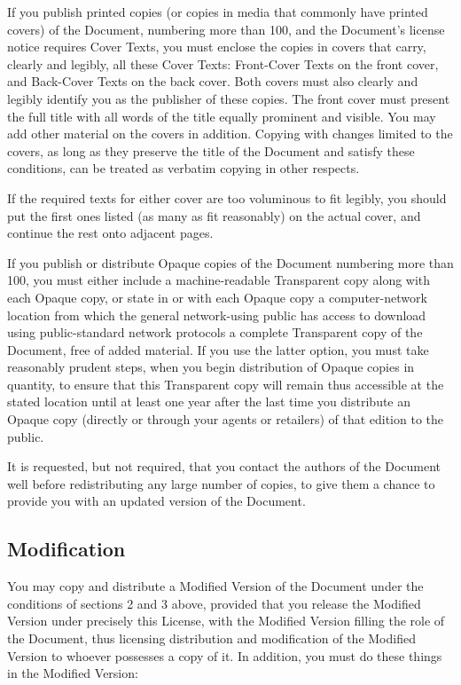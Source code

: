 \documentclass[letterpaper,twoside]{scrartcl}
\begin{document}
   If you publish printed copies (or copies in media that commonly have
   printed covers) of the Document, numbering more than 100, and the
   Document's license notice requires Cover Texts, you must enclose the
   copies in covers that carry, clearly and legibly, all these Cover
   Texts: Front-Cover Texts on the front cover, and Back-Cover Texts on
   the back cover.  Both covers must also clearly and legibly identify
   you as the publisher of these copies.  The front cover must present
   the full title with all words of the title equally prominent and
   visible.  You may add other material on the covers in addition.
   Copying with changes limited to the covers, as long as they preserve
   the title of the Document and satisfy these conditions, can be treated
   as verbatim copying in other respects.

   If the required texts for either cover are too voluminous to fit
   legibly, you should put the first ones listed (as many as fit
   reasonably) on the actual cover, and continue the rest onto adjacent
   pages.

   If you publish or distribute Opaque copies of the Document numbering
   more than 100, you must either include a machine-readable Transparent
   copy along with each Opaque copy, or state in or with each Opaque copy
   a computer-network location from which the general network-using
   public has access to download using public-standard network protocols
   a complete Transparent copy of the Document, free of added material.
   If you use the latter option, you must take reasonably prudent steps,
   when you begin distribution of Opaque copies in quantity, to ensure
   that this Transparent copy will remain thus accessible at the stated
   location until at least one year after the last time you distribute an
   Opaque copy (directly or through your agents or retailers) of that
   edition to the public.

   It is requested, but not required, that you contact the authors of the
   Document well before redistributing any large number of copies, to give
   them a chance to provide you with an updated version of the Document.


   
   
   \subsection{Modification}
   

   You may copy and distribute a Modified Version of the Document under
   the conditions of sections 2 and 3 above, provided that you release
   the Modified Version under precisely this License, with the Modified
   Version filling the role of the Document, thus licensing distribution
   and modification of the Modified Version to whoever possesses a copy
   of it.  In addition, you must do these things in the Modified Version:
\end{document}
